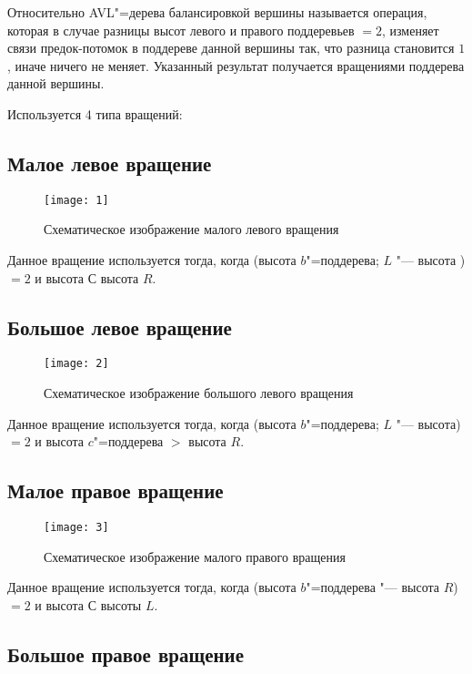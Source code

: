 Относительно AVL"=дерева балансировкой вершины называется операция,
которая в случае разницы высот левого и правого поддеревьев $= 2$,
изменяет связи предок-потомок в поддереве данной вершины так,
что разница становится $  1$, иначе ничего не меняет.
Указанный результат получается вращениями поддерева данной вершины.

Используется 4 типа вращений:

\subsection*{Малое левое вращение}

\begin{figure}[h]
    \texttt{[image: 1]}
    
    \caption{Схематическое изображение малого левого вращения}    
\end{figure}

Данное вращение используется тогда,
когда (высота $b$"=поддерева; $L$ "--- высота )
$= 2$ и высота $С $ высота $R$.

\subsection*{Большое левое вращение}

\begin{figure}[h]
\texttt{[image: 2]}

\caption{Схематическое изображение большого левого вращения}
\end{figure}

Данное вращение используется тогда,
когда (высота $b$"=поддерева; $L$ "--- высота)
$= 2$ и высота $c$"=поддерева $>$ высота $R$.

\subsection*{Малое правое вращение}

\begin{figure}[h]
    \texttt{[image: 3]}
    
    \caption{Схематическое изображение малого правого вращения}
\end{figure}

Данное вращение используется тогда,
когда (высота $b$"=поддерева "--- высота $R$)
$= 2$ и высота $С  $ высоты $L$.

\subsection*{Большое правое вращение}

